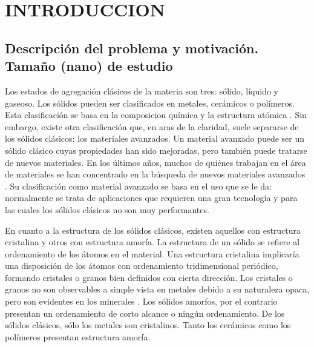 
\chapter{INTRODUCCION} %

\label{C1} %



\section{Descripción del problema y motivación. Tamaño (nano) de estudio}
\label{S1_1}

Los estados de agregación clásicos de la materia son tres: sólido, líquido y gaseoso. Los sólidos pueden ser clasificados en metales, cerámicos o polímeros. Esta clasificación se basa en la composicion química y la estructura atómica \citep{callister95}. Sin embargo, existe otra clasificación que, en aras de la claridad, suele separarse de los sólidos clásicos: los materiales avanzados. Un material avanzado puede ser un sólido clásico cuyas propiedades han sido mejoradas, pero también puede tratarse de nuevos materiales. En los últimos años, muchos de quiénes trabajan en el área de materiales se han concentrado en la búsqueda de nuevos materiales avanzados \citep{suryana11}. Su clasificación como material avanzado se basa en el uso que se le da: normalmente se trata de aplicaciones que requieren una gran tecnología y para las cuales los sólidos clásicos no son muy performantes.

En cuanto a la estructura de los sólidos clásicos, existen aquellos con estructura cristalina y otros con estructura amorfa. La estructura de un sólido se refiere al ordenamiento de los átomos en el material. Una estructura cristalina implicaría una disposición de los átomos con ordenamiento tridimensional periódico, formando cristales o granos bien definidos con cierta dirección. Los cristales o granos no son observables a simple vista en metales debido a su naturaleza opaca, pero son evidentes en los minerales \citep{smith96}. Los sólidos amorfos, por el contrario presentan un ordenamiento de corto alcance o ningún ordenamiento. De los sólidos clásicos, sólo los metales son cristalinos. Tanto los cerámicos como los polímeros presentan estructura amorfa.

